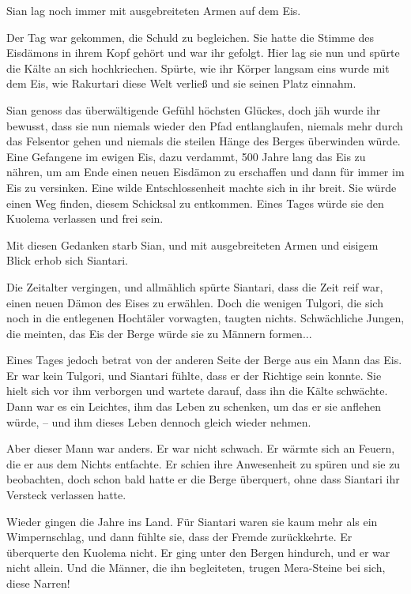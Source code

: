 \documentclass[10pt, a4paper, oneside]{book}
\begin{document}
\begin{multicols}{2}
Sian lag noch immer mit ausgebreiteten Armen auf dem Eis.\bigskip

Der Tag war gekommen, die Schuld zu begleichen. Sie hatte die Stimme des Eisdämons in ihrem Kopf gehört und war ihr gefolgt. Hier lag sie nun und spürte die Kälte an sich hochkriechen. Spürte, wie ihr Körper langsam eins wurde mit dem Eis, wie Rakurtari diese Welt verließ und sie seinen Platz einnahm.

Sian genoss das überwältigende Gefühl höchsten Glückes, doch jäh wurde ihr bewusst, dass sie nun niemals wieder den Pfad entlanglaufen, niemals mehr durch das Felsentor gehen und niemals die steilen Hänge des Berges überwinden würde. Eine Gefangene im ewigen Eis, dazu verdammt, 500 Jahre lang das Eis zu nähren, um am Ende einen neuen Eisdämon zu erschaffen und dann für immer im Eis zu versinken. Eine wilde Entschlossenheit machte sich in ihr breit. Sie würde einen Weg finden, diesem Schicksal zu entkommen. Eines Tages würde sie den Kuolema verlassen und frei sein.\bigskip

Mit diesen Gedanken starb Sian, und mit ausgebreiteten Armen und eisigem Blick erhob sich Siantari.

Die Zeitalter vergingen, und allmählich spürte Siantari, dass die Zeit reif war, einen neuen Dämon des Eises zu erwählen. Doch die wenigen Tulgori, die sich noch in die entlegenen Hochtäler vorwagten, taugten nichts. Schwächliche Jungen, die meinten, das Eis der Berge würde sie zu Männern formen...

Eines Tages jedoch betrat von der anderen Seite der Berge aus ein Mann das Eis. Er war kein Tulgori, und Siantari fühlte, dass er der Richtige sein konnte. Sie hielt sich vor ihm verborgen und wartete darauf, dass ihn die Kälte schwächte. Dann war es ein Leichtes, ihm das Leben zu schenken, um das er sie anflehen würde, – und ihm dieses Leben dennoch gleich wieder nehmen.\bigskip

Aber dieser Mann war anders. Er war nicht schwach. Er wärmte sich an Feuern, die er aus dem Nichts entfachte. Er schien ihre Anwesenheit zu spüren und sie zu beobachten, doch schon bald hatte er die Berge überquert, ohne dass Siantari ihr Versteck verlassen hatte.

Wieder gingen die Jahre ins Land. Für Siantari waren sie kaum mehr als ein Wimpernschlag, und dann fühlte sie, dass der Fremde zurückkehrte. Er überquerte den Kuolema nicht. Er ging unter den Bergen hindurch, und er war nicht allein. Und die Männer, die ihn begleiteten, trugen Mera-Steine bei sich, diese Narren!


\end{multicols}
\end{document}
